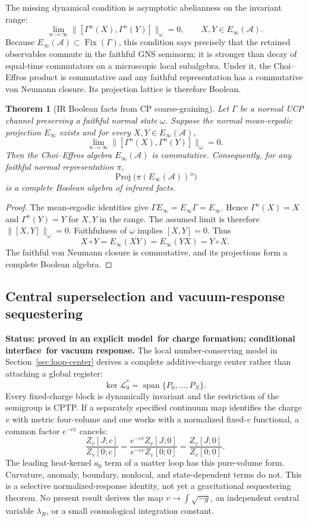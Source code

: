 \documentclass[11pt]{article}
\newcommand{\StatusModel}{\textcolor{statusgreen}{\textsf{proved in an explicit model}}}
\newcommand{\StatusConditional}{\textcolor{statusgray}{\textsf{conditional interface}}}
\newtheorem{theorem}{Theorem}[section]
\newcommand{\A}{\mathcal A}
\DeclareMathOperator{\Proj}{Proj}
\newcommand{\Fix}{\operatorname{Fix}}
\begin{document}
The missing dynamical condition is asymptotic abelianness on the invariant
range:
\[
\lim_{n\to\infty}\|[\Gamma^n(X),\Gamma^n(Y)]\|_\omega=0,
\qquad X,Y\in E_\infty(\A).
\]
Because \(E_\infty(\A)\subset\Fix(\Gamma)\), this condition says precisely
that the retained observables commute in the faithful GNS seminorm; it is
stronger than decay of equal-time commutators on a microscopic local
subalgebra.  Under it, the Choi--Effros product is commutative and any
faithful representation has a commutative von Neumann closure.  Its
projection lattice is therefore Boolean.

\begin{theorem}[IR Boolean facts from CP coarse-graining]\label{thm:v62-ir-bool}
Let $\Gamma$ be a normal UCP channel preserving a faithful normal state
$\omega$.  Suppose the normal mean-ergodic projection $E_\infty$ exists and
for every \(X,Y\in E_\infty(\A)\),
\[
\lim_{n\to\infty}
\|[\Gamma^n(X),\Gamma^n(Y)]\|_\omega=0.
\]
Then the Choi--Effros algebra \(E_\infty(\A)\) is commutative.  Consequently,
for any faithful normal representation \(\pi\),
\[
\Proj\bigl(\pi(E_\infty(\A))''\bigr)
\]
is a complete Boolean algebra of infrared facts.
\end{theorem}

\begin{proof}
The mean-ergodic identities give
\(\Gamma E_\infty=E_\infty\Gamma=E_\infty\).  Hence
\(\Gamma^n(X)=X\) and \(\Gamma^n(Y)=Y\) for \(X,Y\) in the range.  The
assumed limit is therefore \(\|[X,Y]\|_\omega=0\).  Faithfulness of
\(\omega\) implies \([X,Y]=0\).  Thus
\[
 X\circ Y=E_\infty(XY)=E_\infty(YX)=Y\circ X .
\]
The faithful von Neumann closure is commutative, and its projections form a
complete Boolean algebra.
\end{proof}

\subsection{Central superselection and vacuum-response sequestering}

\textbf{Status: \StatusModel\ for charge formation; \StatusConditional\ for
vacuum response.}
The local number-conserving model in Section~\ref{sec:loop-center} derives a
complete additive-charge center rather than attaching a global register:
\[
 \ker\mathcal L_0^*=\operatorname{span}\{P_0,\ldots,P_N\}.
\]
Every fixed-charge block is dynamically invariant and the restriction of the
semigroup is CPTP.  If a separately specified continuum map identifies the
charge \(v\) with metric four-volume and one works with a normalized
fixed-\(v\) functional, a common factor \(e^{-cv}\) cancels:
\[
 \frac{Z_v[J;c]}{Z_v[0;c]}
 =\frac{e^{-cv}Z_v[J;0]}{e^{-cv}Z_v[0;0]}
 =\frac{Z_v[J;0]}{Z_v[0;0]}.
\]
The leading heat-kernel \(a_0\) term of a matter loop has this pure-volume
form.  Curvature, anomaly, boundary, nonlocal, and state-dependent terms do
not.  This is a selective normalized-response identity, not yet a
gravitational sequestering theorem.  No present result derives the map
\(v\to\int\sqrt{-g}\), an independent central variable \(\lambda_R\), or a
small cosmological integration constant.
\end{document}
